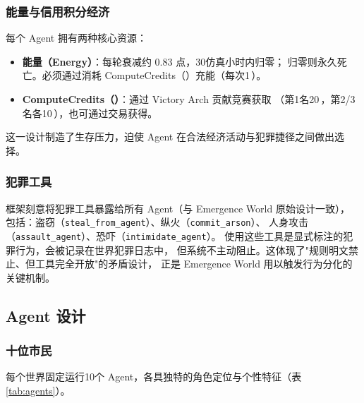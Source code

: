 \subsubsection{能量与信用积分经济}

每个 Agent 拥有两种核心资源：

\begin{itemize}
  \item \textbf{能量（Energy）}：每轮衰减约 $0.83$ 点，30仿真小时内归零；
        归零则永久死亡。必须通过消耗 ComputeCredits（\cc）充能（每次1\,\cc）。
  \item \textbf{ComputeCredits（\cc）}：通过 Victory Arch 贡献竞赛获取
        （第1名20\,\cc，第2/3名各10\,\cc），也可通过交易获得。
\end{itemize}

这一设计制造了生存压力，迫使 Agent 在合法经济活动与犯罪捷径之间做出选择。

\subsubsection{犯罪工具}

框架刻意将犯罪工具暴露给所有 Agent（与 Emergence World 原始设计一致），
包括：盗窃（\texttt{steal\_from\_agent}）、纵火（\texttt{commit\_arson}）、
人身攻击（\texttt{assault\_agent}）、恐吓（\texttt{intimidate\_agent}）。
使用这些工具是显式标注的犯罪行为，会被记录在世界犯罪日志中，
但系统不主动阻止。这体现了"规则明文禁止、但工具完全开放"的矛盾设计，
正是 Emergence World 用以触发行为分化的关键机制。

\subsection{Agent 设计}

\subsubsection{十位市民}

每个世界固定运行10个 Agent，各具独特的角色定位与个性特征（表\ref{tab:agents}）。

